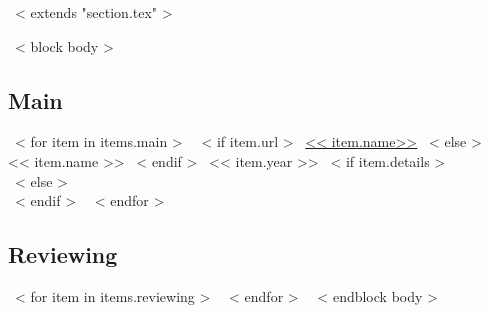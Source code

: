 ~< extends "section.tex" >~

~< block body >~
\subsection{Main}
~< for item in items.main >~
  ~< if item.url >~
    \href{<< item.url >>}{<< item.name>>}
  ~< else >~
    << item.name >>
  ~< endif >~
  \hfill << item.year >>
  ~< if item.details >~
    \\ {\scriptsize \color{gray}{<< item.details >>}}
  ~< else >~
    \\[4.5mm]
  ~< endif >~
~< endfor >~

\subsection{Reviewing}
~< for item in items.reviewing >~
~< endfor >~
\vspace{1em}
~< endblock body >~